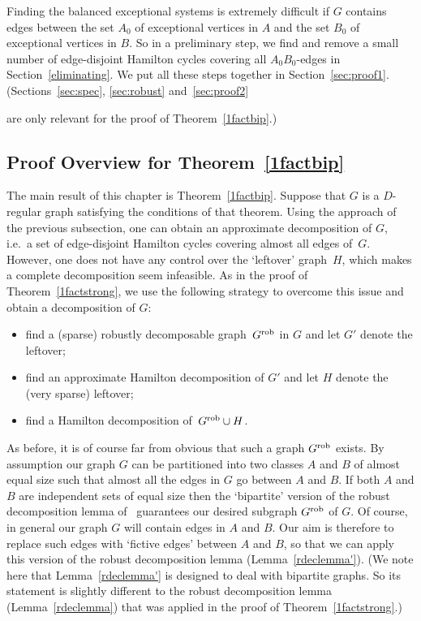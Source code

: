 \documentclass{memo-l}
\def\COMMENT#1{}
\numberwithin{section}{chapter}
\numberwithin{equation}{section}
\numberwithin{firstthm}{section}
\numberwithin{figure}{section}
\begin{document}
{Finding the balanced exceptional systems is extremely difficult if $G$ contains edges between the set $A_0$ of exceptional vertices in $A$ and the
set $B_0$ of exceptional vertices in $B$.
So in a preliminary step, we find and remove a small number of edge-disjoint Hamilton cycles covering all $A_0B_0$-edges in Section~\ref{eliminating}.
We put all these steps together in Section~\ref{sec:proof1}.
(Sections~\ref{sec:spec}, \ref{sec:robust} and~\ref{sec:proof2}%
\COMMENT{osthus added sec 9} 
are only relevant for the proof of Theorem~\ref{1factbip}.)






\subsection{Proof Overview for Theorem~\ref{1factbip}}
The main result of this chapter is Theorem~\ref{1factbip}.
Suppose that $G$ is a $D$-regular graph satisfying the conditions of that theorem.
Using the approach of the previous subsection, one can obtain an approximate decomposition of $G$,
i.e.~a set of edge-disjoint Hamilton cycles covering almost all edges of~$G$.
However, one does not have any control over the `leftover' graph~$H$, which makes a complete decomposition seem infeasible.
As in the proof of Theorem~\ref{1factstrong}, we use the following strategy to overcome this issue and
 obtain a decomposition of $G$:
\begin{itemize}
\item[(1)] find a (sparse) robustly decomposable graph~$G^{\rm rob}$ in $G$ and let $G'$ denote the leftover;
\item[(2)] find an approximate Hamilton decomposition of $G'$ and let $H$ denote the (very sparse) leftover;
\item[(3)] find a Hamilton decomposition of~$G^{\rm rob} \cup H$.
\end{itemize}
As before, it is of course far from obvious that such a graph $G^{\rm rob}$ exists.
By assumption our graph $G$ can be partitioned into two classes $A$ and $B$ of almost equal size such that almost all the edges in $G$ go between $A$ and $B$.
If both $A$ and $B$ are independent sets of equal size then the `bipartite' version of the robust decomposition lemma of~\cite{Kelly} guarantees our desired subgraph $G^{\rm rob}$ of $G$.
Of course, in general our graph $G$  will contain edges in $A$ and $B$. 
Our aim is therefore to replace such edges with `fictive  edges' between $A$ and $B$, so that we can apply this version of the
robust decomposition lemma (Lemma~\ref{rdeclemma'}). (We note here that  Lemma~\ref{rdeclemma'} is designed to deal with bipartite graphs. So its statement is slightly different to the  robust decomposition lemma (Lemma~\ref{rdeclemma}) that was applied in the proof of  Theorem~\ref{1factstrong}.)

}
\end{document}
